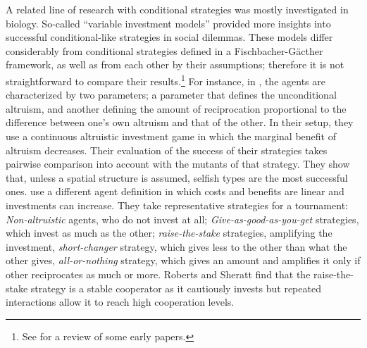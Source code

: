 \documentclass[12pt]{article}
\begin{document}
A related line of research with conditional strategies was mostly investigated in biology. So-called ``variable investment models'' provided more insights into successful conditional-like strategies in social dilemmas. These models differ considerably from conditional strategies defined in a Fischbacher-G{\"a}cther framework, as well as from each other by their assumptions; therefore it is not straightforward to compare their results.\footnote{See \citet{Sherratt2002-lx} for a review of some early papers.} For instance,  in \citet{Doebeli1998-cw}, the agents are characterized by two parameters; a parameter that defines the unconditional altruism, and another defining the amount of reciprocation proportional to the difference between one's own altruism and that of the other. In their setup, they use a continuous altruistic investment game in which the marginal benefit of altruism  decreases.  Their evaluation of the success of their strategies takes pairwise comparison into account with the mutants of that strategy. They show that, unless a spatial structure is assumed, selfish types are the most successful ones. \citet{Roberts1998-es} use a different agent definition in which costs and benefits are linear and investments can increase. They take representative strategies for a tournament: \textit{Non-altruistic} agents, who do not invest at all; \textit{Give-as-good-as-you-get} strategies, which invest as much as the other; \textit{raise-the-stake} strategies, amplifying the investment, \textit{short-changer} strategy, which gives less to the other than what the other gives, \textit{all-or-nothing} strategy, which gives an amount and amplifies it only if other reciprocates as much or more. Roberts and Sheratt find that the raise-the-stake strategy is a stable cooperator as it cautiously invests but repeated interactions allow it to reach high cooperation levels.
\end{document}
